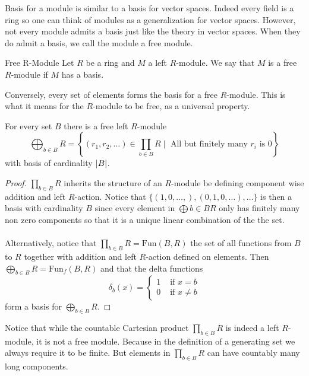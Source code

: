 \documentclass[a4paper]{article}
\begin{document}
Basis for a module is similar to a basis for vector spaces. Indeed every field is a ring so one can think of modules as a generalization for vector spaces. However, not every module admits a basis just like the theory in vector spaces. When they do admit a basis, we call the module a free module. 

\begin{defn}{Free R-Module}{} Let $R$ be a ring and $M$ a left $R$-module. We say that $M$ is a free $R$-module if $M$ has a basis. 
\end{defn}

Conversely, every set of elements forms the basis for a free $R$-module. This is what it means for the $R$-module to be free, as a universal property. 

\begin{lmm}{}{} For every set $B$ there is a free left $R$-module $$\bigoplus_{b\in B}R=\left\{(r_1,r_2,\dots)\in\prod_{b\in B}R\;|\;\text{ All but finitely many }r_i\text{ is }0\right\}$$ with basis of cardinality $\abs{B}$. \tcbline
\begin{proof}
$\prod_{b\in B}R$ inherits the structure of an $R$-module be defining component wise addition and left $R$-action. Notice that $\{(1,0,\dots,),(0,1,0,\dots),\dots\}$ is then a basis with cardinality $B$ since every element in $\bigoplus{b\in B}R$ only has finitely many non zero components so that it is a unique linear combination of the the set. \\~\\

Alternatively, notice that $\prod_{b\in B}R=\text{Fun}(B,R)$ the set of all functions from $B$ to $R$ together with addition and left $R$-action defined on elements. Then $\bigoplus_{b\in B}R=\text{Fun}_f(B,R)$ and that the delta functions $$\delta_b(x)=\begin{cases}
1 & \text{ if } x=b\\
0 & \text{ if } x\neq b
\end{cases}$$ form a basis for $\bigoplus_{b\in B}R$. 
\end{proof}
\end{lmm}

Notice that while the countable Cartesian product $\prod_{b\in B}R$ is indeed a left $R$-module, it is not a free module. Because in the definition of a generating set we always require it to be finite. But elements in $\prod_{b\in B}R$ can have countably many long components. 
\end{document}

